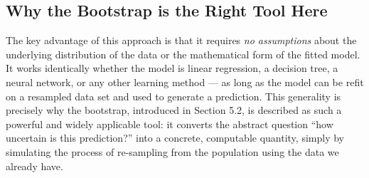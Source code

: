 \documentclass[11pt]{article}
\begin{document}
\subsection*{Why the Bootstrap is the Right Tool Here}

The key advantage of this approach is that it requires \emph{no assumptions} about the underlying distribution of the data or the mathematical form of the fitted model. It works identically whether the model is linear regression, a decision tree, a neural network, or any other learning method --- as long as the model can be refit on a resampled data set and used to generate a prediction. This generality is precisely why the bootstrap, introduced in Section 5.2, is described as such a powerful and widely applicable tool: it converts the abstract question ``how uncertain is this prediction?'' into a concrete, computable quantity, simply by simulating the process of re-sampling from the population using the data we already have.
\end{document}
